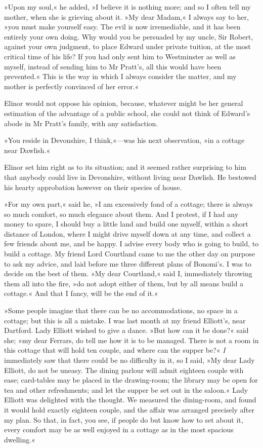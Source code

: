 »Upon my soul,« he added, »I believe it is nothing more; and so I often tell my mother, when she is grieving about it. »My dear Madam,« I always say to her, »you must make yourself easy. The evil is now irremediable, and it has been entirely your own doing. Why would you be persuaded by my uncle, Sir Robert, against your own judgment, to place Edward under private tuition, at the most critical time of his life? If you had only sent him to Westminster as well as myself, instead of sending him to Mr Pratt’s, all this would have been prevented.« This is the way in which I always consider the matter, and my mother is perfectly convinced of her error.«

Elinor would not oppose his opinion, because, whatever might be her general estimation of the advantage of a public school, she could not think of Edward’s abode in Mr Pratt’s family, with any satisfaction.

»You reside in Devonshire, I think,«—was his next observation, »in a cottage near Dawlish.«

Elinor set him right as to its situation; and it seemed rather surprising to him that anybody could live in Devonshire, without living near Dawlish. He bestowed his hearty approbation however on their species of house.

»For my own part,« said he, »I am excessively fond of a cottage; there is always so much comfort, so much elegance about them. And I protest, if I had any money to spare, I should buy a little land and build one myself, within a short distance of London, where I might drive myself down at any time, and collect a few friends about me, and be happy. I advise every body who is going to build, to build a cottage. My friend Lord Courtland came to me the other day on purpose to ask my advice, and laid before me three different plans of Bonomi’s. I was to decide on the best of them. »My dear Courtland,« said I, immediately throwing them all into the fire, »do not adopt either of them, but by all means build a cottage.« And that I fancy, will be the end of it.«

»Some people imagine that there can be no accommodations, no space in a cottage; but this is all a mistake. I was last month at my friend Elliott’s, near Dartford. Lady Elliott wished to give a dance. »But how can it be done?« said she; »my dear Ferrars, do tell me how it is to be managed. There is not a room in this cottage that will hold ten couple, and where can the supper be?« \textit{I} immediately saw that there could be no difficulty in it, so I said, »My dear Lady Elliott, do not be uneasy. The dining parlour will admit eighteen couple with ease; card-tables may be placed in the drawing-room; the library may be open for tea and other refreshments; and let the supper be set out in the saloon.« Lady Elliott was delighted with the thought. We measured the dining-room, and found it would hold exactly eighteen couple, and the affair was arranged precisely after my plan. So that, in fact, you see, if people do but know how to set about it, every comfort may be as well enjoyed in a cottage as in the most spacious dwelling.«

